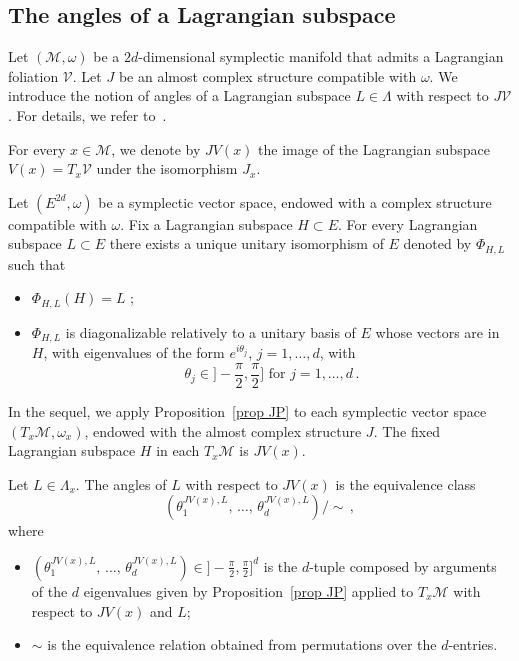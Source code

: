 \documentclass[AHL, Unicode, longabstracts, published]{cedram}
\newcommand*\M{\mathcal{M}}
\newcommand*\cv{\mathcal{V}}
\begin{document}
\subsection{The angles of a Lagrangian subspace}

Let $(\M,\omega)$ be a $2d$-dimensional symplectic manifold that admits a Lagrangian foliation $\cv$. Let $J$ be an almost complex structure compatible with $\omega$. We introduce the notion of angles of a Lagrangian subspace $L\in\Lambda$ with respect to $J\cv$. For details, we refer to~\cite{LPS}.

\begin{nota}
For every $x\in \M$, we denote by $JV(x)$ the image of the Lagrangian subspace $V(x)=T_x\cv$ under the isomorphism $J_x$.
\end{nota}


\begin{prop}\label{prop JP}
Let $(E^{2d},\omega)$ be a symplectic vector space, endowed with a complex structure compatible with $\omega$. Fix a Lagrangian subspace $H\subset E$. For every Lagrangian subspace $L\subset E$ there exists a unique unitary isomorphism of $E$ denoted by $\Phi_{H,L} $ such that
\begin{itemize}
\item $\Phi_{H,L}(H)=L$ ;
\item $\Phi_{H,L}$ is diagonalizable relatively to a unitary
basis {of $E$ whose vectors are} in $H$, with eigenvalues of the form $e^{i\theta_j}$, $j=1,\dots,d$, with
\[
\theta_j\in\mathopen{\Big]}-\frac \pi 2,\frac \pi 2\mathclose{\Big]}\text{ for }j=1,\dots,d\,.
\]
\end{itemize}
\end{prop}


In the sequel, we apply Proposition~\ref{prop JP} to each symplectic vector space $(T_x\M,\omega_x)$, endowed with the almost complex structure $J$. The fixed Lagrangian subspace $H$ in each $T_x\M$ is $JV(x)$.

\begin{defi}
Let $L\in\Lambda_x$. The angles of $L$ with respect to $JV(x)$ is the equivalence class
\[
\left(\theta_1^{JV(x),L},\,\dots,\,\theta_d^{JV(x),L}\right)/\sim\,,
\]
where
\begin{itemize}
\item $(\theta_1^{JV(x),L},\,\dots,\,\theta_d^{JV(x),L})\in]-\frac{\pi}{2},\frac{\pi}{2}]^d$ is the $d$-tuple composed by arguments of the $d$ eigenvalues given by Proposition~\ref{prop JP} applied to $T_x\M$ with respect to $JV(x)$ and $L$;
\item $\sim$ is the equivalence relation obtained from permutations over the $d$-entries.
\end{itemize}
\end{defi}
\end{document}

